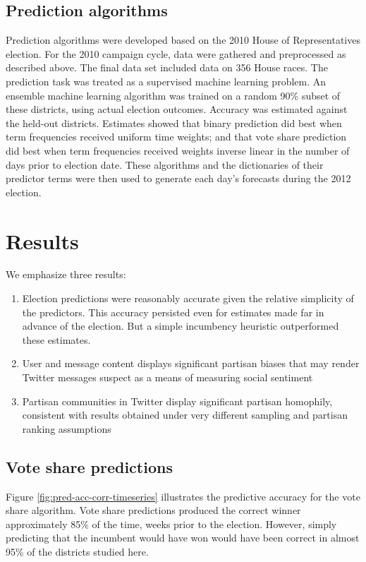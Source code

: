 \documentclass[11pt]{article}
\begin{document}
\subsection{Prediction algorithms}
\label{sec:pred-algor}

Prediction algorithms were developed based on the 2010 House of
Representatives election. For the 2010 campaign cycle, data were
gathered and preprocessed as described above. The final data set
included data on 356 House races. The prediction task was treated as a
supervised machine learning problem. An ensemble machine learning
algorithm \cite{van2007super} was trained on a random 90\% subset of
these districts, using actual election outcomes. Accuracy was
estimated against the held-out districts. Estimates showed that binary
prediction did best when term frequencies received uniform time
weights; and that vote share prediction did best when term frequencies
received weights inverse linear in the number of days prior to
election date. These algorithms and the dictionaries of their
predictor terms were then used to generate each day's forecasts during
the 2012 election.



\section{Results}
\label{sec:results}

We emphasize three results:
\begin{enumerate}
\item Election predictions were reasonably accurate given the relative
  simplicity of the predictors. This accuracy persisted even for
  estimates made far in advance of the election. But a simple
  incumbency heuristic outperformed these estimates. 
\item User and message content displays significant partisan biases
  that may render Twitter messages suspect as a means of measuring
  social sentiment
\item Partisan communities in Twitter display significant partisan
  homophily, consistent with results obtained under very different
  sampling and partisan ranking assumptions
\end{enumerate}

\subsection{Vote share predictions}
\label{sec:predictions}
Figure \ref{fig:pred-acc-corr-timeseries} illustrates the predictive
accuracy for the vote share algorithm. Vote share predictions produced
the correct winner approximately 85\% of the time, weeks prior
to the election. However, simply predicting that the incumbent would
have won would have been correct in almost 95\% of the districts
studied here. 
\end{document}
